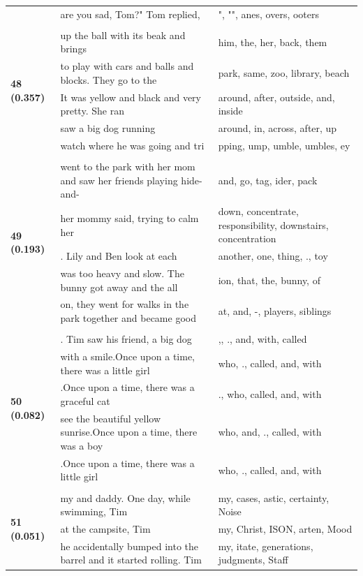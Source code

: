\documentclass{article}
\theoremstyle{plain}
\theoremstyle{definition}
\theoremstyle{remark}
\begin{document}
\begin{longtable}{|p{}|p{}|p{}|}
& are you sad, Tom?" Tom replied, & ",  "", anes, overs, ooters \\
& & \\
\multirow{5}{*}{\textbf{48 (0.357)}} & up the ball with its beak and brings & him,  the,  her,  back,  them \\
& to play with cars and balls and blocks. They go to the & park,  same,  zoo,  library,  beach \\
& It was yellow and black and very pretty. She ran & around,  after,  outside,  and,  inside \\
& saw a big dog running & around,  in,  across,  after,  up \\
& watch where he was going and tri & pping, ump, umble, umbles, ey \\
& & \\
\multirow{5}{*}{\textbf{49 (0.193)}} & went to the park with her mom and saw her friends playing hide-and- & and, go, tag, ider, pack \\
& her mommy said, trying to calm her & down,  concentrate,  responsibility,  downstairs,  concentration \\
& .  Lily and Ben look at each & another,  one,  thing, .,  toy \\
& was too heavy and slow. The bunny got away and the all & ion,  that,  the,  bunny,  of \\
& on, they went for walks in the park together and became good & at,  and, -,  players,  siblings \\
& & \\
\multirow{5}{*}{\textbf{50 (0.082)}} & . Tim saw his friend, a big dog & ,, .,  and,  with,  called \\
& with a smile.Once upon a time, there was a little girl & who, .,  called,  and,  with \\
& .Once upon a time, there was a graceful cat & .,  who,  called,  and,  with \\
& see the beautiful yellow sunrise.Once upon a time, there was a boy & who,  and, .,  called,  with \\
& .Once upon a time, there was a little girl & who, .,  called,  and,  with \\
& & \\
\multirow{5}{*}{\textbf{51 (0.051)}} & my and daddy. One day, while swimming, Tim & my, cases, astic,  certainty,  Noise \\
& at the campsite, Tim & my,  Christ, ISON, arten,  Mood \\
& he accidentally bumped into the barrel and it started rolling. Tim & my, itate,  generations,  judgments, Staff \\

\end{longtable}
\end{document}
